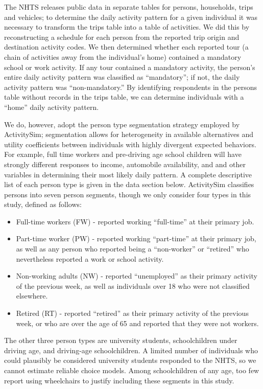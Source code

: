 \documentclass[3p, authoryear, review]{elsarticle} %
\providecommand{\tightlist}{%
  \setlength{\itemsep}{0pt}\setlength{\parskip}{0pt}}
\begin{document}
The NHTS releases public data in separate tables for persons, households,
trips and vehicles; to determine the daily activity pattern for a given
individual it was necessary to transform the trips table into a table of
activities. We did this by reconstructing a schedule for each person from the
reported trip origin and destination activity codes. We then determined whether
each reported tour (a chain of activities away from the individual's home)
contained a mandatory school or work activity. If any tour contained a mandatory
activity, the person's entire daily activity pattern was classified as ``mandatory'';
if not, the daily activity pattern was ``non-mandatory.'' By identifying respondents
in the persons table without records in the trips table, we can determine
individuals with a ``home'' daily activity pattern.

We do, however, adopt the person type segmentation strategy employed by
ActivitySim; segmentation allows for heterogeneity in available
alternatives and utility coefficients between individuals with highly divergent
expected behaviors. For example, full time workers and pre-driving age school children
will have strongly different responses to income, automobile availability, and
and other variables in determining their most likely daily pattern.
A complete descriptive list of each person type is given in the data
section below.
ActivitySim classifies persons into seven person segments, though we only
consider four types in this study, defined as follows:

\begin{itemize}
\tightlist
\item
  Full-time workers (FW) - reported working ``full-time'' at their primary job.
\item
  Part-time worker (PW) - reported working ``part-time'' at their primary job,
  as well as any person who reported being a ``non-worker'' or ``retired'' who nevertheless
  reported a work or school activity.
\item
  Non-working adults (NW) - reported ``unemployed'' as their primary activity
  of the previous week, as well as individuals over 18 who were not classified
  elsewhere.
\item
  Retired (RT) - reported ``retired'' as their primary activity of the previous
  week, or who are over the age of 65 and reported that they were not workers.
\end{itemize}

The other three person types are university students, schoolchildren under
driving age, and driving-age schoolchildren. A limited number of individuals who
could plausibly be considered university students responded to the NHTS, so we
cannot estimate reliable choice models. Among schoolchildren of any age, too few
report using wheelchairs to justify including these segments in this study.
\end{document}
